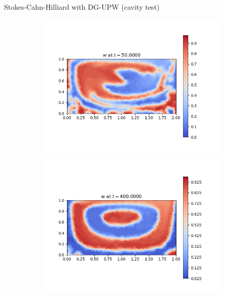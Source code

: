 \begin{frame}{Stokes-Cahn-Hilliard with DG-UPW {\small(cavity test)}}
\begin{figure}[t]
		\begin{subfigure}{0.49\textwidth}
			\centering
			\includegraphics[scale=0.28]{img/stokes-cahn-hilliard/w_DG-UPW+Eyre_stokes_nt-40000_t-50.00000_P0.png}
		\end{subfigure}
		\hspace*{-1.5cm}
		\begin{subfigure}{0.49\textwidth}
			\centering
			\includegraphics[scale=0.28]{img/stokes-cahn-hilliard/w_DG-UPW+Eyre_stokes_nt-40000_t-400.00000_P0.png}
		\end{subfigure}
	\end{figure}
\end{frame}

